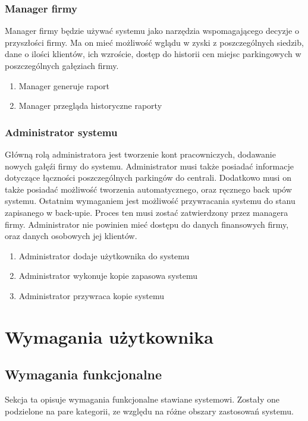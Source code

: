 \documentclass[paper=a4, fontsize=11pt]{scrartcl} %
\begin{document}
\subsubsection{Manager firmy}

Manager firmy będzie używać systemu jako narzędzia wspomagającego decyzje o przyszłości firmy. Ma on mieć możliwość 
wglądu w zyski z poszczególnych siedzib, dane o ilości klientów, ich wzroście, dostęp do historii cen miejsc parkingowych
w poszczególnych gałęziach firmy.

\begin{enumerate}
  \item Manager generuje raport
  \item Manager przegląda historyczne raporty
\end{enumerate}

\subsubsection{Administrator systemu }

Główną rolą administratora jest tworzenie kont pracowniczych, dodawanie nowych gałęźi firmy do systemu.
Administrator musi także posiadać informacje dotyczące łączności poszczególnych parkingów do centrali.
Dodatkowo musi on także posiadać możliwość tworzenia automatycznego, oraz ręcznego back upów systemu.
Ostatnim wymaganiem jest możliwość przywracania systemu do stanu zapisanego w back-upie. Proces ten musi 
zostać zatwierdzony przez managera firmy. Administrator nie powinien mieć dostępu do danych finansowych firmy,
oraz danych osobowych jej klientów.


\begin{enumerate}
  \item Administrator dodaje użytkownika do systemu
  \item Administrator wykonuje kopie zapasowa systemu
  \item Administrator przywraca kopie systemu
\end{enumerate}

\section{Wymagania użytkownika}

\subsection{Wymagania funkcjonalne}

Sekcja ta opisuje wymagania funkcjonalne stawiane systemowi. 
Zostały one podzielone na pare kategorii, ze względu na różne obszary zastosowań systemu.
\end{document}
